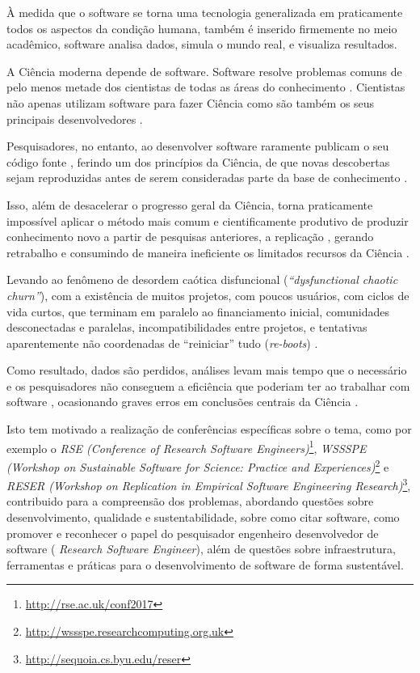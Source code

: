 {À medida que o software se torna uma tecnologia generalizada em praticamente
todos os aspectos da condição humana, também é inserido firmemente no meio
acadêmico, software analisa dados, simula o mundo real, e visualiza
resultados.}

A Ciência moderna depende de software. Software resolve problemas comuns de
pelo menos metade dos cientistas de todas as áreas do conhecimento
\cite{wilson2014best}. Cientistas não apenas utilizam software para fazer Ciência como são também
os seus principais desenvolvedores
\cite{goble2014better}.

Pesquisadores, no entanto, ao desenvolver software raramente publicam o
seu código fonte \cite{robles2010replicating, amann2015software}, ferindo um dos
princípios da Ciência, de que novas descobertas sejam reproduzidas antes de
serem consideradas parte da base de conhecimento \cite{stodden2009enabling}.

Isso, além de desacelerar o progresso geral da Ciência, torna praticamente
impossível aplicar o método mais comum e cientificamente produtivo de produzir
conhecimento novo a partir de pesquisas anteriores, a replicação
\cite{king1995replication, stodden2010reproducible}, gerando retrabalho e
consumindo de maneira ineficiente os limitados recursos da Ciência
\cite{howison2013incentives, katz2014transitive}.

Levando ao fenômeno de desordem caótica disfuncional ({\it ``dysfunctional
chaotic churn''}), com a existência de muitos projetos, com poucos
usuários, com ciclos de vida curtos, que terminam em paralelo ao financiamento
inicial, comunidades desconectadas e paralelas, incompatibilidades entre
projetos, e tentativas aparentemente não coordenadas de ``reiniciar'' tudo
({\it re-boots}) \cite{howison2015understanding}.

Como resultado, dados são perdidos,
análises levam mais tempo que o necessário e os pesquisadores não conseguem a
eficiência que poderiam ter ao trabalhar com software
\cite{wilson2017good},
ocasionando graves erros em conclusões centrais da Ciência \cite{merali2010computational}.


Isto tem motivado a realização de conferências específicas sobre o tema,
como por exemplo o {\it RSE (Conference of Research
Software Engineers)}\footnote{ \url{http://rse.ac.uk/conf2017}}, {\it WSSSPE
(Workshop on Sustainable Software for Science: Practice and
Experiences)}\footnote{ \url{http://wssspe.researchcomputing.org.uk}} e {\it
RESER (Workshop on Replication in Empirical Software Engineering
Research)}\footnote{ \url{http://sequoia.cs.byu.edu/reser}}, contribuido para
a compreensão dos problemas, abordando questões sobre desenvolvimento,
qualidade e sustentabilidade, sobre como citar software, como promover e
reconhecer o papel do pesquisador engenheiro desenvolvedor de software ({\it
Research Software Engineer}), além de questões sobre infraestrutura,
ferramentas e práticas para o desenvolvimento de software de forma sustentável.

